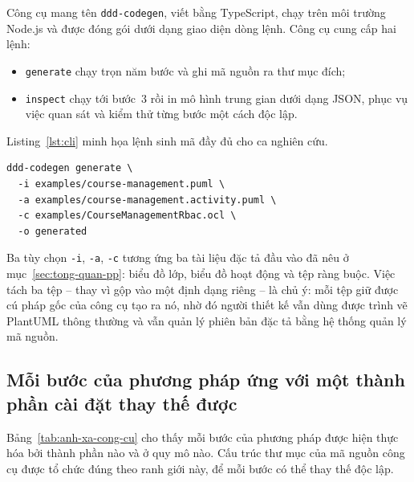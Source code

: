 Công cụ mang tên \texttt{ddd-codegen}, viết bằng TypeScript, chạy trên môi trường Node.js và được đóng gói dưới dạng giao diện dòng lệnh. Công cụ cung cấp hai lệnh:

\begin{itemize}[leftmargin=1.6em,itemsep=2pt]
  \item \texttt{generate} chạy trọn năm bước và ghi mã nguồn ra thư mục đích;
  \item \texttt{inspect} chạy tới bước~3 rồi in mô hình trung gian dưới dạng JSON, phục vụ việc quan sát và kiểm thử từng bước một cách độc lập.
\end{itemize}

Listing~\ref{lst:cli} minh họa lệnh sinh mã đầy đủ cho ca nghiên cứu.

\begin{lstlisting}[caption={Lệnh sinh mã trên ca nghiên cứu CourseMan},label={lst:cli}]
ddd-codegen generate \
  -i examples/course-management.puml \
  -a examples/course-management.activity.puml \
  -c examples/CourseManagementRbac.ocl \
  -o generated
\end{lstlisting}

Ba tùy chọn \texttt{-i}, \texttt{-a}, \texttt{-c} tương ứng ba tài liệu đặc tả đầu vào đã nêu ở mục~\ref{sec:tong-quan-pp}: biểu đồ lớp, biểu đồ hoạt động và tệp ràng buộc. Việc tách ba tệp -- thay vì gộp vào một định dạng riêng -- là chủ ý: mỗi tệp giữ được cú pháp gốc của công cụ tạo ra nó, nhờ đó người thiết kế vẫn dùng được trình vẽ PlantUML thông thường và vẫn quản lý phiên bản đặc tả bằng hệ thống quản lý mã nguồn.

\subsection{Mỗi bước của phương pháp ứng với một thành phần cài đặt thay thế được}

Bảng~\ref{tab:anh-xa-cong-cu} cho thấy mỗi bước của phương pháp được hiện thực hóa bởi thành phần nào và ở quy mô nào. Cấu trúc thư mục của mã nguồn công cụ được tổ chức đúng theo ranh giới này, để mỗi bước có thể thay thế độc lập.

